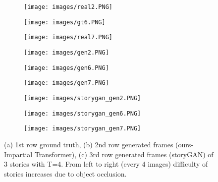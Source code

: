 \documentclass{article}
\begin{document}
\begin{figure*}[h!]
    \centering
    \begin{subfigure}{0.33\textwidth}
        \texttt{[image: images/real2.PNG]}
\end{subfigure}
    \begin{subfigure}{0.33\textwidth}
        \texttt{[image: images/gt6.PNG]}
\end{subfigure}
    \begin{subfigure}{0.33\textwidth}
        \texttt{[image: images/real7.PNG]}
\end{subfigure}
    \begin{subfigure}{0.33\textwidth}
        \texttt{[image: images/gen2.PNG]}
\end{subfigure}
        \begin{subfigure}{0.33\textwidth}
        \texttt{[image: images/gen6.PNG]}
\end{subfigure}
    \begin{subfigure}{0.33\textwidth}
        \texttt{[image: images/gen7.PNG]}
\end{subfigure}
      \begin{subfigure}{0.33\textwidth}
        \texttt{[image: images/storygan\_gen2.PNG]}
\end{subfigure}
        \begin{subfigure}{0.33\textwidth}
        \texttt{[image: images/storygan\_gen6.PNG]}
\end{subfigure}
    \begin{subfigure}{0.33\textwidth}
        \texttt{[image: images/storygan\_gen7.PNG]}
\end{subfigure}
    \caption{(a) 1st row ground truth, (b) 2nd row generated frames (ours-Impartial Transformer), (c) 3rd row generated frames (storyGAN) of 3 stories with T=4. From left to right (every 4 images) difficulty of stories increases due to object occlusion.}
    \label{fig:examples}
\end{figure*}
\end{document}
